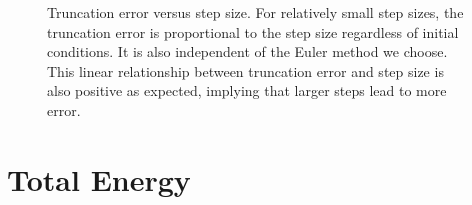\documentclass[a4paper, 11pt]{article}
\begin{document}
\begin{figure}[H]
\caption{Truncation error versus step size. For relatively small step sizes, the truncation error is proportional to the step size regardless of initial conditions. It is also independent of the Euler method we choose. This linear relationship between truncation error and step size is also positive as expected, implying that larger steps lead to more error.}
\end{figure}

\section{Total Energy}
 \begin{figure}[H]
\\

\end{figure}
\end{document}

